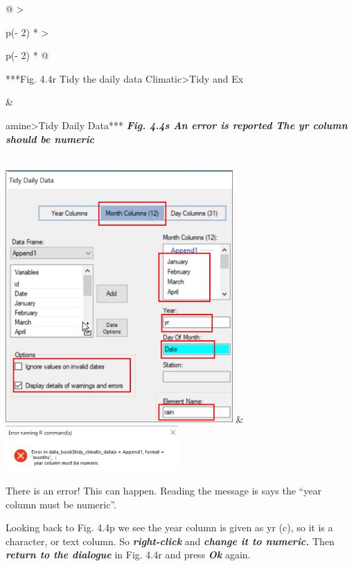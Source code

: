 \documentclass[
  letterpaper,
  DIV=11,
  numbers=noendperiod]{scrreprt}
\begin{document}
\begin{longtable}[]{@{}
  >{\raggedright\arraybackslash}p{(\columnwidth - 2\tabcolsep) * }
  >{\raggedright\arraybackslash}p{(\columnwidth - 2\tabcolsep) * }@{}}
\toprule\noalign{}
\begin{minipage}[b]{\linewidth}\raggedright
***Fig. 4.4r Tidy the daily data Climatic\textgreater Tidy and Ex
\end{minipage} & \begin{minipage}[b]{\linewidth}\raggedright
amine\textgreater Tidy Daily Data*** \textbf{\emph{Fig. 4.4s An error is
reported The yr column should be numeric}}
\end{minipage} \\
\midrule\noalign{}
\endhead
\bottomrule\noalign{}
\endlastfoot
\includegraphics[width=3.414in,height=3.80027in]{figures/Fig4.4r.png} &
\includegraphics[width=2.59627in,height=0.67896in]{figures/Fig4.4s.png} \\
\end{longtable}

There is an error! This can happen. Reading the message is says the
``year column must be numeric''.

Looking back to Fig. 4.4p we see the year column is given as yr (c), so
it is a character, or text column. So \textbf{\emph{right-click}} and
\textbf{\emph{change it to numeric.}} Then \textbf{\emph{return to the
dialogue}} in Fig. 4.4r and press \textbf{\emph{Ok}} again.
\end{document}
